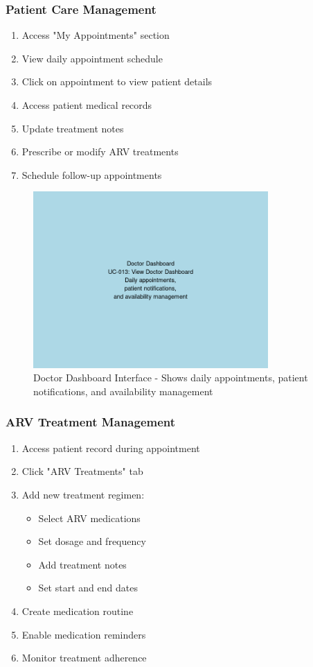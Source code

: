 \documentclass[12pt,a4paper]{article}
\begin{document}
\subsubsection{Patient Care Management}

\begin{enumerate}
    \item Access "My Appointments" section
    \item View daily appointment schedule
    \item Click on appointment to view patient details
    \item Access patient medical records
    \item Update treatment notes
    \item Prescribe or modify ARV treatments
    \item Schedule follow-up appointments
\end{enumerate}

\begin{figure}[H]
\centering
\includegraphics[width=0.8\textwidth]{images/doctor_dashboard.png}
\caption{Doctor Dashboard Interface - Shows daily appointments, patient notifications, and availability management}
\end{figure}

\subsubsection{ARV Treatment Management}

\begin{enumerate}
    \item Access patient record during appointment
    \item Click "ARV Treatments" tab
    \item Add new treatment regimen:
    \begin{itemize}
        \item Select ARV medications
        \item Set dosage and frequency
        \item Add treatment notes
        \item Set start and end dates
    \end{itemize}
    \item Create medication routine
    \item Enable medication reminders
    \item Monitor treatment adherence
\end{enumerate}
\end{document}

